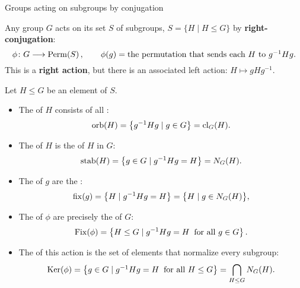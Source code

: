\documentclass[8pt, handout]{beamer}
\newcommand{\Pause}{}      %
\begin{document}
\begin{frame}{Groups acting on subgroups by conjugation} \smallskip
  
  Any group $G$ acts on its set $S$ of subgroups, $S = \{H \mid H \leq G\}$ by
  \textbf{right-conjugation}:
  \[
  \phi\colon G\longrightarrow\operatorname{Perm}(S)\,,\qquad
  \phi(g)=\mbox{the permutation that sends each $H$ to
    $g^{-1}Hg$.}
  \]
  \Pause This is a \textbf{right action}, but there is an associated left
  action: $H\mapsto gHg^{-1}$.
  
  \medskip\Pause

  Let $H\leq G$ be an element of $S$. \smallskip\Pause
  \begin{itemize}
  \item The  of $H$ consists of all : %
    \[
    \operatorname{orb}(H)=\big\{g^{-1}Hg\mid g\in G\big\}=\operatorname{cl}_G(H).
    \]
    \vspace{-4mm}\Pause
  \item The  of $H$ is the
     of $H$ in $G$: 
    \[
    \operatorname{stab}(H)=\big\{g\in G\mid g^{-1}Hg=H\big\}=N_G(H).
    \]
    \vspace{-4mm}\Pause
  \item The  of $g$ are the
    :
    \[
    \operatorname{fix}(g)=\big\{H\mid g^{-1}Hg=H\big\}=\big\{H\mid g\in N_G(H)\big\},
    \]
    \vspace{-4mm}\Pause
  \item The  of $\phi$ are precisely the
     of $G$: %
    \[
    \operatorname{Fix}(\phi)=\big\{H\leq G\mid g^{-1}Hg=H\;\;\text{for all }g\in G\big\}\,.
    \]
    \vspace{-4mm}\Pause
  \item The  of this action is the set of elements that
    normalize every subgroup:
    \[
    \begin{array}{c@{\hspace{1mm}}c@{\hspace{1mm}}l}
      \Ker(\phi)
      &=&\big\{g\in G\mid g^{-1}Hg=H\;\;\text{for all }H\leq G\big\}
      \Pause=\displaystyle\bigcap_{H\leq G} N_G(H).
    \end{array}
    \]
  \end{itemize}
  
\end{frame}

\end{document}
